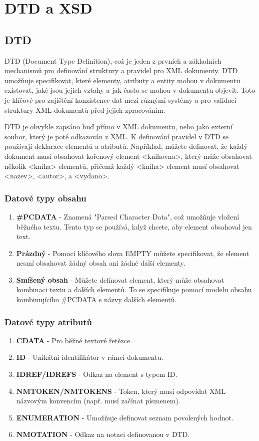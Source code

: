 \chapter{DTD a XSD}
\label{cha:dtd_xsd}

\section{DTD}
\label{sec:dtd}
DTD (Document Type Definition), což je jeden z prvních a základních mechanismů pro definování struktury a pravidel pro XML dokumenty. DTD umožňuje specifikovat, které elementy, atributy a entity mohou v dokumentu existovat, jaké jsou jejich vztahy a jak často se mohou v dokumentu objevit. Toto je klíčové pro zajištění konzistence dat mezi různými systémy a pro validaci struktury XML dokumentů před jejich zpracováním.

DTD je obvykle zapsáno buď přímo v XML dokumentu, nebo jako externí soubor, který je poté odkazován z XML. K definování pravidel v DTD se používají deklarace elementů a atributů. Například, můžete definovat, že každý dokument musí obsahovat kořenový element <knihovna>, který může obsahovat několik <kniha> elementů, přičemž každý <kniha> element musí obsahovat <nazev>, <autor>, a <vydano>.

\subsection{Datové typy obsahu}
\begin{enumerate}
    \item \textbf{\#PCDATA} - Znamená "Parsed Character Data", což umožňuje vložení běžného textu. Tento typ se používá, když chcete, aby element obsahoval jen text.
    \item \textbf{Prázdný} - Pomocí klíčového slova EMPTY můžete specifikovat, že element nesmí obsahovat žádný obsah ani žádné další elementy.
    \item \textbf{Smíšený obsah} - Můžete definovat element, který může obsahovat kombinaci textu a dalších elementů. To se specifikuje pomocí modelu obsahu kombinujícího \#PCDATA s názvy dalších elementů.
\end{enumerate}

\subsection{Datové typy atributů}
\begin{enumerate}
    \item \textbf{CDATA} - Pro běžné textové řetězce.
    \item \textbf{ID} - Unikátní identifikátor v rámci dokumentu.
    \item \textbf{IDREF/IDREFS} - Odkaz na element s typem ID.
    \item \textbf{NMTOKEN/NMTOKENS} - Token, který musí odpovídat XML názvovým konvencím (např. musí začínat písmenem).
    \item \textbf{ENUMERATION} - Umožňuje definovat seznam povolených hodnot.
    \item \textbf{NMOTATION} - Odkaz na notaci definovanou v DTD.
\end{enumerate}


